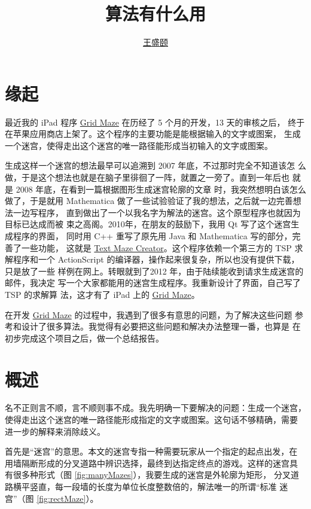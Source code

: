 \documentclass[cs4size,a4paper,adobefonts]{ctexart}
\newcommand{\GridMaze}{\href{http://itunes.apple.com/app/grid-maze/id553265800?mt=8}{Grid Maze}}
\begin{document}
\title{\bfseries 算法有什么用}
\author{\href{mailto:txyyss@gmail.com}{王盛颐}}
\date{}
\maketitle

\section*{缘起}
最近我的 iPad 程序 \GridMaze{} 在历经了 5 个月的开发，13 天的审核之后，
终于在苹果应用商店上架了。这个程序的主要功能是能根据输入的文字或图案，
生成一个迷宫，使得走出这个迷宫的唯一路径能形成当初输入的文字或图案。

生成这样一个迷宫的想法最早可以追溯到 2007 年底，不过那时完全不知道该怎
么做，于是这个想法也就是在脑子里徘徊了一阵，就置之一旁了。直到一年后也
就是 2008 年底，在看到一篇根据图形生成迷宫轮廓的文章
\cite{Xu:2007:ImageMaze}时，我突然想明白该怎么做了，于是就用
Mathematica 做了一些试验验证了我的想法，之后就一边完善想法一边写程序，
直到做出了一个以我名字为解法的迷宫。这个原型程序也就因为目标已达成而被
束之高阁。2010年，在朋友的鼓励下，我用 Qt 写了这个迷宫生成程序的界面，
同时用 C++ 重写了原先用 Java 和 Mathematica 写的部分，完善了一些功能，
这就是
\href{https://sites.google.com/site/txyyss/projects/text-maze-creator}{Text
  Maze Creator}。这个程序依赖一个第三方的 TSP 求解程序和一个
ActionScript 的编译器，操作起来很复杂，所以也没有提供下载，只是放了一些
样例在网上。转眼就到了2012 年，由于陆续能收到请求生成迷宫的邮件，我决定
写一个大家都能用的迷宫生成程序。我重新设计了界面，自己写了 TSP 的求解算
法，这才有了 iPad 上的 \GridMaze。

在开发 \GridMaze{} 的过程中，我遇到了很多有意思的问题，为了解决这些问题
参考和设计了很多算法。我觉得有必要把这些问题和解决办法整理一番，也算是
在初步完成这个项目之后，做一个总结报告。

\section{概述}
名不正则言不顺，言不顺则事不成。我先明确一下要解决的问题：生成一个迷宫，
使得走出这个迷宫的唯一路径能形成指定的文字或图案。这句话不够精确，需要
进一步的解释来消除歧义。

首先是“迷宫”的意思。本文的迷宫专指一种需要玩家从一个指定的起点出发，在
用墙隔断形成的分叉道路中辨识选择，最终到达指定终点的游戏。这样的迷宫具
有很多种形式（图 \ref{fig:manyMazes}），我要生成的迷宫是外轮廓为矩形，
分叉道路横平竖直，每一段墙的长度为单位长度整数倍的，解法唯一的所谓“标准
迷宫”（图 \ref{fig:rectMaze}）。
\end{document}
